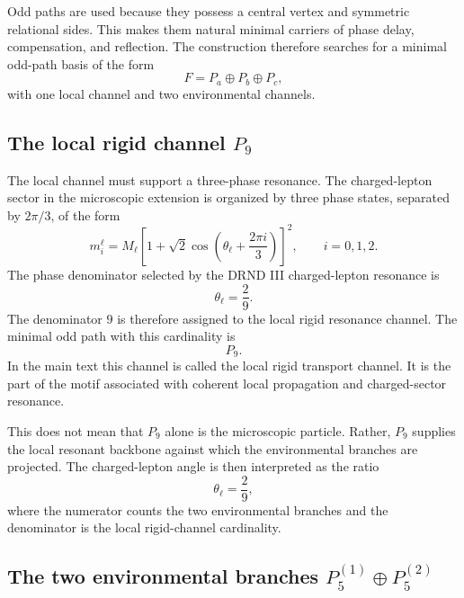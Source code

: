 \documentclass[12pt]{iopart}
\begin{document}
Odd paths are used because they possess a central vertex and symmetric relational sides. This makes them natural minimal carriers of phase delay, compensation, and reflection. The construction therefore searches for a minimal odd-path basis of the form
\begin{equation}
F=P_a\oplus P_b\oplus P_c,
\end{equation}
with one local channel and two environmental channels.

\subsection{The local rigid channel \texorpdfstring{$P_9$}{P9}}

The local channel must support a three-phase resonance. The charged-lepton sector in the microscopic extension is organized by three phase states, separated by \(2\pi/3\), of the form
\begin{equation}
m_i^\ell
=
M_\ell
\left[
1+\sqrt{2}\cos\left(
\theta_\ell+\frac{2\pi i}{3}
\right)
\right]^2,
\qquad i=0,1,2.
\end{equation}
The phase denominator selected by the DRND III charged-lepton resonance is
\begin{equation}
\theta_\ell=\frac{2}{9}.
\end{equation}
The denominator \(9\) is therefore assigned to the local rigid resonance channel. The minimal odd path with this cardinality is
\begin{equation}
P_9.
\end{equation}
In the main text this channel is called the local rigid transport channel. It is the part of the motif associated with coherent local propagation and charged-sector resonance.

This does not mean that \(P_9\) alone is the microscopic particle. Rather, \(P_9\) supplies the local resonant backbone against which the environmental branches are projected. The charged-lepton angle is then interpreted as the ratio
\begin{equation}
\theta_\ell
=
\frac{2}{9},
\end{equation}
where the numerator counts the two environmental branches and the denominator is the local rigid-channel cardinality.

\subsection{The two environmental branches \texorpdfstring{$P_5^{(1)}\oplus P_5^{(2)}$}{P5(1)+P5(2)}}
\end{document}
